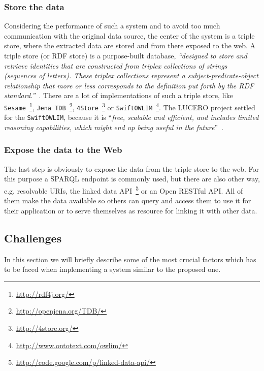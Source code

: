 {\subsubsection{Store the data}\label{subsubsec:store}
Considering the performance of such a system and to avoid too much communication with the original data source, the center of the system is a triple store, where the extracted data are stored and from there exposed to the web. A triple store (or RDF store) is a purpose-built database, \textit{``designed to store and retrieve identities that are constructed from triplex collections of strings (sequences of letters). These triplex collections represent a subject-predicate-object relationship that more or less corresponds to the definition put forth by the RDF standard.''}~\citet{url:triplestore}. There are a lot of implementations of such a triple store, like 
\texttt{Sesame}~\footnote{\url{http://rdf4j.org/}}, 
\texttt{Jena TDB}~\footnote{\url{http://openjena.org/TDB/}}, 
\texttt{4Store}~\footnote{\url{http://4store.org/}} or 
\texttt{SwiftOWLIM}~\footnote{\url{http://www.ontotext.com/owlim/}}. The LUCERO project settled for the \texttt{SwiftOWLIM}, because it is ``\textit{free, scalable and efficient, and includes limited reasoning capabilities, which might end up being useful in the future}''~\citet{url:lucero-tabloid}.

\subsubsection{Expose the data to the Web}\label{subsubsec:provision}
The last step is obviously to expose the data from the triple store to the web. For this purpose a SPARQL endpoint is commonly used, but there are also other way, e.g. resolvable URIs, the linked data API~\footnote{\url{http://code.google.com/p/linked-data-api/}} or an Open RESTful API. All of them make the data available so others can query and access them to use it for their application or to serve themselves as resource for linking it with other data.

\subsection{Challenges}
In this section we will briefly describe some of the most crucial factors which has to be faced when implementing a system similar to the proposed one.

}

